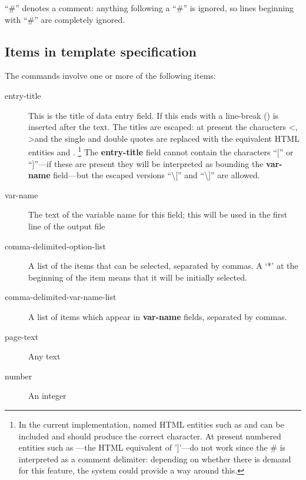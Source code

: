 \documentclass[letterpaper,10pt,english]{sphinxmanual}
\begin{document}
“\#” denotes a comment: anything following a “\#” is ignored, so lines
beginning with “\#” are completely ignored.


\subsection{Items in template specification}
\label{forms:items-in-template-specification}
The commands involve one or more of the following items:
\begin{description}
\item[{entry-title}] \leavevmode
This is the title of data entry field. If this ends with \code{/} a
line-break () is inserted after the text. The titles are
escaped: at present the characters \textless{}, \textgreater{}and the single and double
quotes are replaced with the equivalent HTML entities
 and . \footnote{
In the current implementation, named HTML entities such as 
and  can be included and should produce the correct
character. At present numbered entities such as —the HTML
equivalent of ’{]}’—do not work since the \# is interpreted as a comment
delimiter: depending on whether there is demand for this feature, the
system could provide a way around this.
} The \textbf{entry-title}
field cannot contain the characters “{[}” or “{]}”—if these are present
they will be interpreted as bounding the \textbf{var-name} field—but the
escaped versions “\textbackslash{}{[}” and “\textbackslash{}{]}” are allowed.

\item[{var-name}] \leavevmode
The text of the variable name for this field; this will be used in
the first line of the  output file

\item[{comma-delimited-option-list}] \leavevmode
A list of the items that can be selected, separated by commas. A
‘*’ at the beginning of the item means that it will be initially
selected.

\item[{comma-delimited-var-name-list}] \leavevmode
A list of items which appear in \textbf{var-name} fields, separated by
commas.

\item[{page-text}] \leavevmode
Any text

\item[{number}] \leavevmode
An integer

\end{description}
\end{document}
